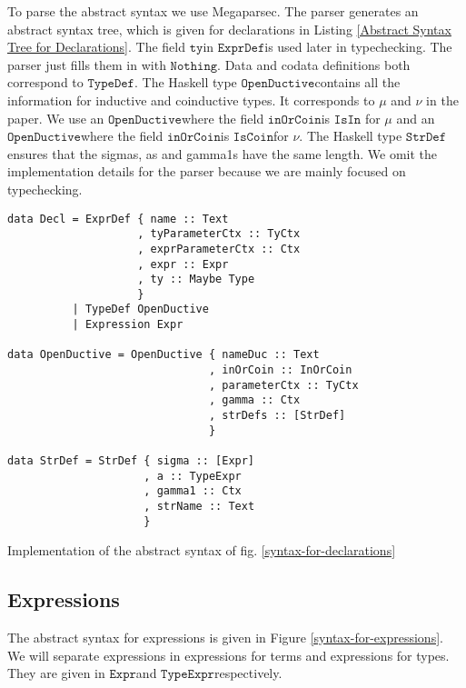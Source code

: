 \documentclass[a4paper,cleardoubleempty,BCOR1cm]{scrbook}
\begin{document}
To parse the abstract syntax we use Megaparsec. The parser generates an
abstract syntax tree, which is given for declarations in Listing
\ref{Abstract Syntax Tree for Declarations}. The field $\mathtt{ty}$\;in $\mathtt{ExprDef}$\;is used later in
typechecking. The parser just fills them in with $\mathtt{Nothing}$. Data and codata
definitions both correspond to $\mathtt{TypeDef}$. The Haskell type $\mathtt{OpenDuctive}$\;contains all the
information for inductive and coinductive types. It corresponds to \(\mu\) and
\(\nu\) in the paper. We use an $\mathtt{OpenDuctive}$\;where the field $\mathtt{inOrCoin}$\;is $\mathtt{IsIn}$
for \(\mu\) and an $\mathtt{OpenDuctive}$\;where the field $\mathtt{inOrCoin}$\;is $\mathtt{IsCoin}$\;for
\(\nu\).  The Haskell type $\mathtt{StrDef}$\;ensures that the sigmas, as and gamma1s have the
same length.  We omit the implementation details for the parser because we
are mainly focused on typechecking.

\begin{listing}[htbp]
\begin{verbatim}
data Decl = ExprDef { name :: Text
                    , tyParameterCtx :: TyCtx
                    , exprParameterCtx :: Ctx
                    , expr :: Expr
                    , ty :: Maybe Type
                    }
          | TypeDef OpenDuctive
          | Expression Expr

data OpenDuctive = OpenDuctive { nameDuc :: Text
                               , inOrCoin :: InOrCoin
                               , parameterCtx :: TyCtx
                               , gamma :: Ctx
                               , strDefs :: [StrDef]
                               }

data StrDef = StrDef { sigma :: [Expr]
                     , a :: TypeExpr
                     , gamma1 :: Ctx
                     , strName :: Text
                     }
\end{verbatim}
\caption{\label{Abstract Syntax Tree for Declarations}
Implementation of the abstract syntax of fig. \ref{syntax-for-declarations}}
\end{listing}
\subsection{Expressions}
\label{sec:org09156e6}
The abstract syntax for expressions is given in Figure \ref{syntax-for-expressions}.
We will separate expressions in expressions for terms and expressions for
types.  They are given in $\mathtt{Expr}$\;and $\mathtt{TypeExpr}$\;respectively.
\end{document}
